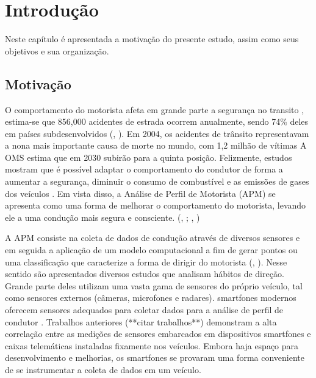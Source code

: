 \chapter{Introdução}\label{Introdução}

Neste capítulo é apresentada a motivação do presente estudo, assim como seus objetivos e sua organização.

\section{Motivação}

O comportamento do motorista afeta em grande parte a segurança no transito \cite{evans2004traffic}, estima-se que 856,000 acidentes de estrada ocorrem anualmente, sendo 74\% deles em países subdesenvolvidos (\citeauthor{worldhealthorganization2018}, \citeyear{worldhealthorganization2018}). Em 2004, os acidentes de trânsito representavam a nona mais importante causa de morte no mundo, com 1,2 milhão de vítimas \cite{bacchieri2011acidentes} A OMS estima que em 2030 subirão para a quinta posição. Felizmente, estudos mostram que é possível adaptar o comportamento do condutor de forma a aumentar a segurança, diminuir o consumo de combustível e as emissões de gases dos veículos \cite{goldberg2000} \cite{almazan2013full}. Em vista disso, a Análise de Perfil de Motorista (APM) se apresenta como uma forma de melhorar o comportamento do motorista, levando ele a uma condução mais segura e consciente. (\citeauthor*{zheng2016unsupervised}, \citeyear{zheng2016unsupervised}; \citeauthor{castignani2015driver},  \citeyear{castignani2015driver})

A APM consiste na coleta de dados de condução através de diversos sensores e em seguida a aplicação de um modelo computacional a fim de gerar pontos ou uma classificação que caracterize a forma de dirigir do motorista (\citeauthor*{eren2012estimating}, \citeyear{eren2012estimating}). Nesse sentido são apresentados diversos estudos que analisam hábitos de direção. Grande parte deles utilizam uma vasta gama de sensores do próprio veículo, tal como sensores externos (câmeras, microfones e radares). 
smartfones modernos oferecem sensores adequados para coletar dados para a análise de perfil de condutor \cite{junior2017driver}. Trabalhos anteriores (**citar trabalhos**) demonstram a alta correlação entre as medições de sensores embarcados em dispositivos smartfones e caixas telemáticas instaladas fixamente nos veículos. Embora haja espaço para desenvolvimento e melhorias, os smartfones se provaram uma forma conveniente de se instrumentar a coleta de dados em um veículo.

